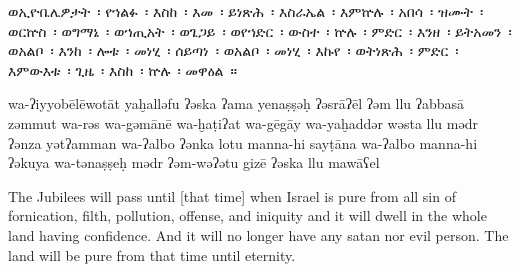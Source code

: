 
\begin{ethiopictext}
    ወኢዮቤሌዎታት~፡ የኀልፉ~፡ እስከ~፡ እመ~፡ ይነጽሕ~፡ እስራኤል~፡
    እምኵሉ~፡ አበሳ~፡ ዝሙት~፡ ወርኵስ~፡ ወግማኔ~፡ ወኀጢአት~፡ ወጌጋይ~፡ 
    ወየኀድር~፡ ውስተ~፡ ኵሉ~፡ ምድር~፡ እንዘ~፡ ይትአመን~፡ ወአልቦ~፡
    እንከ~፡ ሎቱ~፡ መነሂ~፡ ሰይጣነ~፡ ወአልቦ~፡ መነሂ~፡ እኩየ~፡ ወትነጽሕ~፡ 
    ምድር~፡ እምውእቱ~፡ ጊዜ~፡ እስከ~፡ ኵሉ~፡ መዋዕል~።
\end{ethiopictext}

\begin{transliteration}
    wa-ʔiyyobēlēwotāt yaḫalləfu ʔəska ʔama yenaṣṣəḥ ʔəsrāʔēl
    ʔəm llu ʔabbasā zəmmut wa-rə\kw{}s wa-gəmānē wa-ḫaṭiʔat wa-gēgāy
    wa-yaḫaddər wəsta llu mədr ʔənza yətʔamman wa-ʔalbo
    ʔənka lotu manna-hi sayṭāna wa-ʔalbo manna-hi ʔəkuya wa-tənaṣṣeḥ
    mədr ʔəm-wəʔətu gizē ʔəska llu mawāʕel
\end{transliteration}

\begin{translation}
    The Jubilees will pass until [that time] when Israel is pure
    from all sin of fornication, filth, pollution, offense, and iniquity
    and it will dwell in the whole land having confidence. And it will no longer have
    any satan nor evil person. The land will be pure from that time until eternity.
\end{translation}